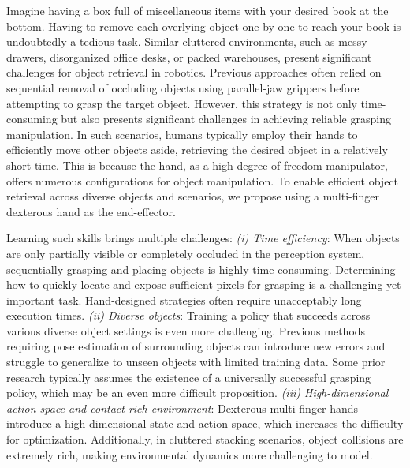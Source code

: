 \documentclass[10pt, a4paper, logo, twocolumn, copyright]{psibot} %
\begin{document}
Imagine having a box full of miscellaneous items with your desired book at the bottom. Having to remove each overlying object one by one to reach your book is undoubtedly a tedious task. Similar cluttered environments, such as messy drawers, disorganized office desks, or packed warehouses, present significant challenges for object retrieval in robotics. Previous approaches often relied on sequential removal of occluding objects using parallel-jaw grippers before attempting to grasp the target object. However, this strategy is not only time-consuming but also presents significant challenges in achieving reliable grasping manipulation. In such scenarios, humans typically employ their hands to efficiently move other objects aside, retrieving the desired object in a relatively short time. This is because the hand, as a high-degree-of-freedom manipulator, offers numerous configurations for object manipulation. To enable efficient object retrieval across diverse objects and scenarios, we propose using a multi-finger dexterous hand as the end-effector.

Learning such skills brings multiple challenges: \textit{(i) Time efficiency}: When objects are only partially visible or completely occluded in the perception system, sequentially grasping and placing objects is highly time-consuming. Determining how to quickly locate and expose sufficient pixels for grasping is a challenging yet important task. Hand-designed strategies often require unacceptably long execution times. \textit{(ii) Diverse objects}: Training a policy that succeeds across various diverse object settings is even more challenging. Previous methods requiring pose estimation of surrounding objects can introduce new errors and struggle to generalize to unseen objects with limited training data. Some prior research typically assumes the existence of a universally successful grasping policy, which may be an even more difficult proposition. \textit{(iii) High-dimensional action space and contact-rich environment}: Dexterous multi-finger hands introduce a high-dimensional state and action space, which increases the difficulty for optimization. Additionally, in cluttered stacking scenarios, object collisions are extremely rich, making environmental dynamics more challenging to model.
\end{document}
